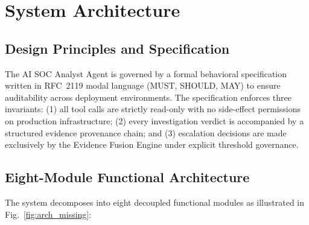 \section{System Architecture}
\label{sec:arch}

\subsection{Design Principles and Specification}

The AI SOC Analyst Agent is governed by a formal behavioral specification written
in RFC~2119 modal language (MUST, SHOULD, MAY) to ensure auditability across
deployment environments. The specification enforces three invariants: (1) all
tool calls are strictly read-only with no side-effect permissions on production
infrastructure; (2) every investigation verdict is accompanied by a structured
evidence provenance chain; and (3) escalation decisions are made exclusively by the
Evidence Fusion Engine under explicit threshold governance.

\subsection{Eight-Module Functional Architecture}

The system decomposes into eight decoupled functional modules as illustrated
in Fig.~\ref{fig:arch_missing}:

